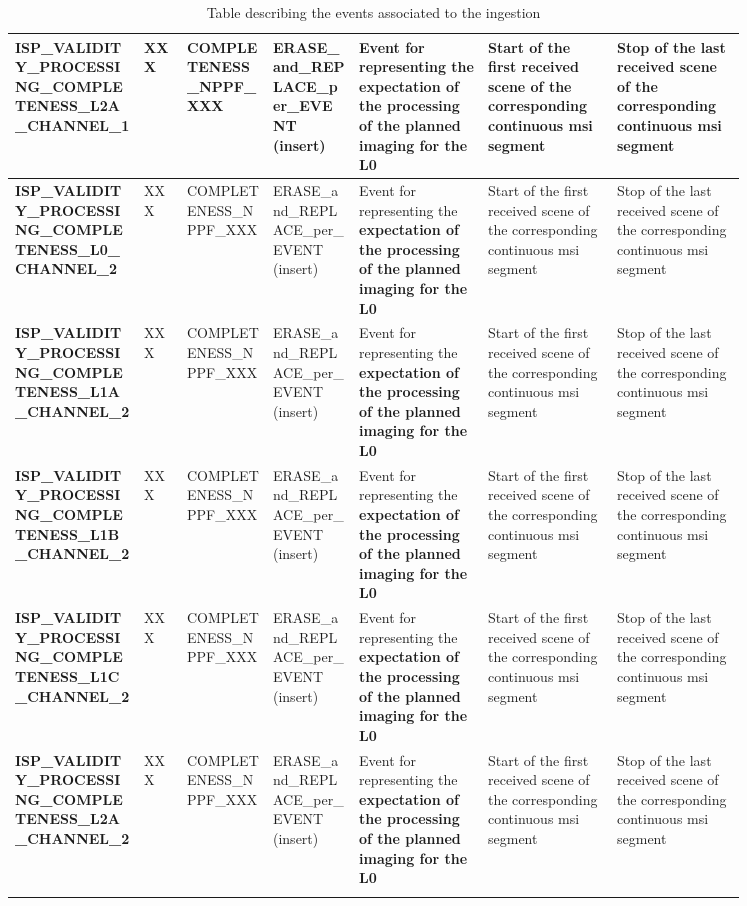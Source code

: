 \begin{landscape}
\begin{longtable}{|M{0.15\linewidth}|M{0.05\linewidth}|M{0.10\linewidth}|M{0.10\linewidth}|M{0.15\linewidth}|M{0.15\linewidth}|M{0.15\linewidth}|}
\textbf{ISP\_VALIDITY\_PROCESSING\_COMPLETENESS\_L2A\_CHANNEL\_1} & XXX & \- COMPLETENESS\_NPPF\_XXX & ERASE\_and\_REPLACE\_per\_EVENT (insert) & Event for representing the \textbf{expectation of the processing of the planned imaging for the L0} & Start of the first received scene of the corresponding continuous \acrshort{msi} segment & Stop of the last received scene of the corresponding continuous \acrshort{msi} segment \\ \hline
\textbf{ISP\_VALIDITY\_PROCESSING\_COMPLETENESS\_L0\_CHANNEL\_2} & XXX & \- COMPLETENESS\_NPPF\_XXX & ERASE\_and\_REPLACE\_per\_EVENT (insert) & Event for representing the \textbf{expectation of the processing of the planned imaging for the L0} & Start of the first received scene of the corresponding continuous \acrshort{msi} segment & Stop of the last received scene of the corresponding continuous \acrshort{msi} segment \\ \hline
\textbf{ISP\_VALIDITY\_PROCESSING\_COMPLETENESS\_L1A\_CHANNEL\_2} & XXX & \- COMPLETENESS\_NPPF\_XXX & ERASE\_and\_REPLACE\_per\_EVENT (insert) & Event for representing the \textbf{expectation of the processing of the planned imaging for the L0} & Start of the first received scene of the corresponding continuous \acrshort{msi} segment & Stop of the last received scene of the corresponding continuous \acrshort{msi} segment \\ \hline
\textbf{ISP\_VALIDITY\_PROCESSING\_COMPLETENESS\_L1B\_CHANNEL\_2} & XXX & \- COMPLETENESS\_NPPF\_XXX & ERASE\_and\_REPLACE\_per\_EVENT (insert) & Event for representing the \textbf{expectation of the processing of the planned imaging for the L0} & Start of the first received scene of the corresponding continuous \acrshort{msi} segment & Stop of the last received scene of the corresponding continuous \acrshort{msi} segment \\ \hline
\textbf{ISP\_VALIDITY\_PROCESSING\_COMPLETENESS\_L1C\_CHANNEL\_2} & XXX & \- COMPLETENESS\_NPPF\_XXX & ERASE\_and\_REPLACE\_per\_EVENT (insert) & Event for representing the \textbf{expectation of the processing of the planned imaging for the L0} & Start of the first received scene of the corresponding continuous \acrshort{msi} segment & Stop of the last received scene of the corresponding continuous \acrshort{msi} segment \\ \hline
\textbf{ISP\_VALIDITY\_PROCESSING\_COMPLETENESS\_L2A\_CHANNEL\_2} & XXX & \- COMPLETENESS\_NPPF\_XXX & ERASE\_and\_REPLACE\_per\_EVENT (insert) & Event for representing the \textbf{expectation of the processing of the planned imaging for the L0} & Start of the first received scene of the corresponding continuous \acrshort{msi} segment & Stop of the last received scene of the corresponding continuous \acrshort{msi} segment \\ \hline
\caption{Table describing the events associated to the ingestion}
\label{tb:description_events_ingestion_dpc}
\end{longtable}
\end{landscape}

